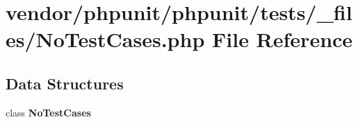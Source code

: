 \section{vendor/phpunit/phpunit/tests/\+\_\+files/\+No\+Test\+Cases.php File Reference}
\label{_no_test_cases_8php}
\subsection*{Data Structures}
\begin{DoxyCompactItemize}
\item 
class {\bf No\+Test\+Cases}
\end{DoxyCompactItemize}

